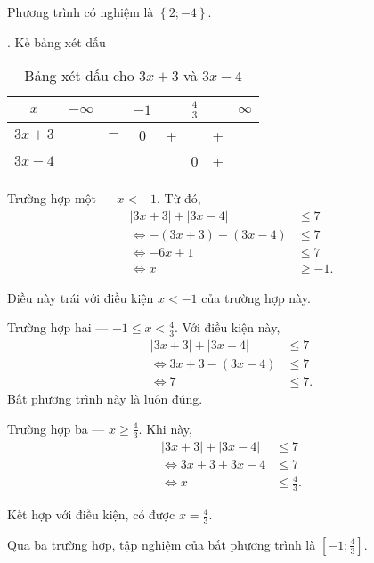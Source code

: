 Phương trình có nghiệm là $\left\{2; -4\right\}$.

. Kẻ bảng xét dấu

\begin{table}[H]
   \centering
   \begin{tabular}{|c|ccccccc|}
   \hline
   $x$          & $-\infty$ &     & $-1$ &     & $\frac{4}{3}$ &   & $\infty$ \\
   \hline
   $3x + 3$        &           & $-$ &  0  &  +  &     & + &           \\
   \hline
   $3x - 4$        &           & $-$ &     & $-$ &  0  & + &           \\
   \hline
   \end{tabular}
   \caption{Bảng xét dấu cho $3x + 3$ và $3x - 4$}
   \label{tab:toan_hoc_nen_tang:ham_so_mot_bien:ham_tung_phan:gpt10}
\end{table}

\textcolor{colorEmphasisCyan}{Trường hợp một --- $x < -1$}. Từ đó,
\begin{align*}
   |3x + 3| + |3x - 4| &\leq 7 \\
   \iff -(3x + 3) - (3x - 4) &\leq 7 \\
   \iff -6x + 1 &\leq 7 \\
   \iff x &\geq -1.
\end{align*}

Điều này trái với điều kiện $x < -1$ của trường hợp này.

\textcolor{colorEmphasis}{Trường hợp hai --- $-1 \leq x < \frac{4}{3}$}. Với điều kiện này,
\begin{align*}
   |3x + 3| + |3x - 4| &\leq 7 \\
   \iff 3x + 3 - (3x - 4) &\leq 7 \\
   \iff 7 &\leq 7.
\end{align*}
Bất phương trình này là luôn đúng.

\textcolor{colorEmphasisGreen}{Trường hợp ba --- $x \geq \frac{4}{3}$}. Khi này,
\begin{align*}
   |3x + 3| + |3x - 4| &\leq 7 \\
   \iff 3x + 3 + 3x - 4 &\leq 7 \\
   \iff x &\leq \frac{4}{3}.
\end{align*}

Kết hợp với điều kiện, có được $x = \frac{4}{3}$.

Qua ba trường hợp, tập nghiệm của bất phương trình là $\left[-1; \frac{4}{3}\right]$.

